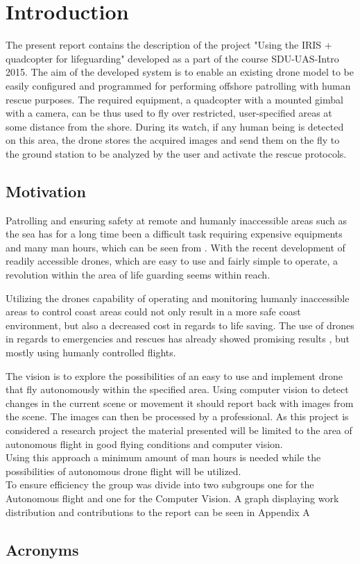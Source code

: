 \chapter*{Introduction}

The present report contains the description of the  project "Using the IRIS + quadcopter for lifeguarding" developed as a part of the course  SDU-UAS-Intro 2015. 
The aim of the developed system is to enable an existing drone model to be easily configured and programmed for performing offshore patrolling with human rescue purposes. 
The required equipment, a quadcopter with a mounted gimbal with a camera, can be thus used to fly over restricted, user-specified areas at some distance from the shore. 
During its watch, if any human being is detected on this area, the drone stores the acquired images and send them on the fly to the ground station to be analyzed by the user and activate the rescue protocols. 



\section*{Motivation}
Patrolling and ensuring safety at remote and humanly inaccessible areas such as the sea has for a long time been a difficult task requiring expensive equipments and many man hours, which can be seen from \cite{Ref:Drone2}. With the recent development of readily accessible drones, which are easy to use and fairly simple to operate, a revolution within the area of life guarding seems within reach. 

Utilizing the drones capability of operating and monitoring humanly inaccessible areas to control coast areas could not only result in a more safe coast environment, but also a decreased cost in regards to life saving. The use of drones in regards to emergencies and rescues has already showed promising results \cite{Ref:Drone1} \cite{Ref:Drone3} \cite{Ref:Drone4} \cite{Ref:DroneResearch1} \cite{Ref:DroneResearch1}, but mostly using humanly controlled flights.

The vision is to explore the possibilities of an easy to use and implement drone that fly autonomously within the specified area. Using computer vision to detect changes in the current scene or movement it should report back with images from the scene. The images can then be processed by a professional. As this project is considered a research project the material presented will be limited to the area of autonomous flight in good flying conditions and computer vision.\\ 
Using this approach a minimum amount of man hours is needed while the possibilities of autonomous drone flight will be utilized.\\
To ensure efficiency the group was divide into two subgroups one for the Autonomous flight and one for the Computer Vision. A graph displaying work distribution and contributions to the report can be seen in Appendix A

\section*{Acronyms}
\begin{acronym}[AWGN]

\end{acronym}